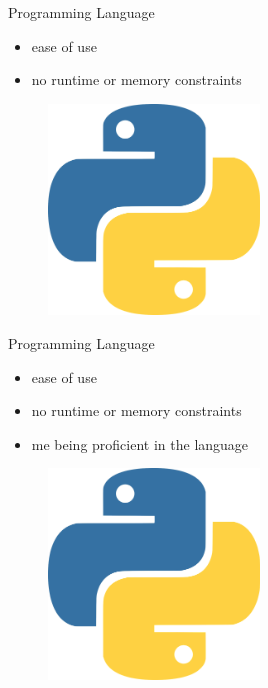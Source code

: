 \documentclass{beamer}
\begin{document}
\begin{frame}{Programming Language}
    \begin{minipage}[c]{0.4\textwidth}
        \begin{itemize}
            \item ease of use
            \item no runtime or memory constraints
        \end{itemize}
    \end{minipage}%
    \begin{minipage}[c]{0.6\textwidth}
        \begin{figure}[H]
            \centering
            \includegraphics[width=0.5\textwidth]{Images/python_logo.png}
        \end{figure}
    \end{minipage}
\end{frame}

\begin{frame}{Programming Language}
    \begin{minipage}[c]{0.4\textwidth}
        \begin{itemize}
            \item ease of use
            \item no runtime or memory constraints
            \item me being proficient in the language
        \end{itemize}
    \end{minipage}%
    \begin{minipage}[c]{0.6\textwidth}
        \begin{figure}[H]
            \centering
            \includegraphics[width=0.5\textwidth]{Images/python_logo.png}
        \end{figure}
    \end{minipage}
\end{frame}
\end{document}
